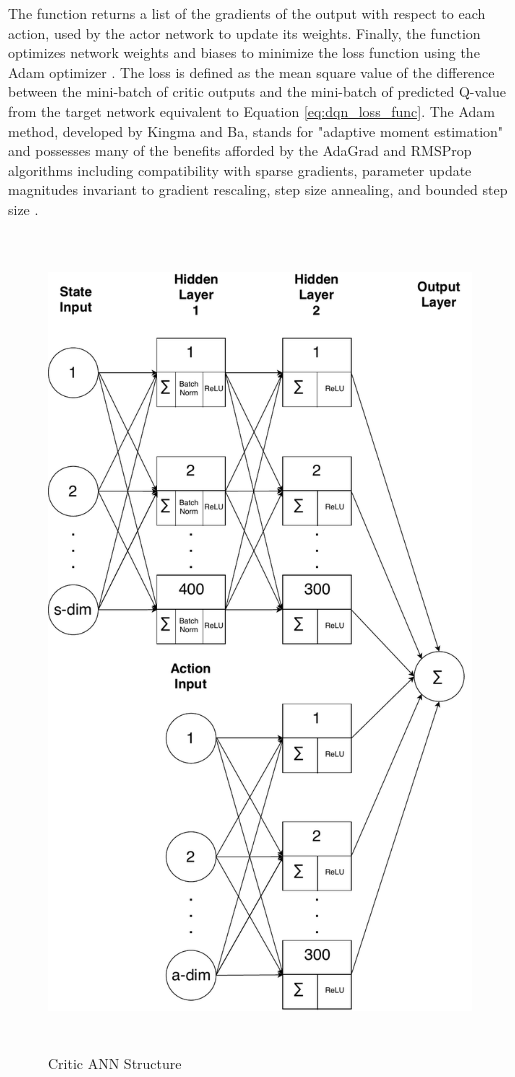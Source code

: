 The  function returns a list of the gradients of the output with respect to each action, used by the actor network to update its weights. Finally, the  function optimizes network weights and biases to minimize the loss function using the Adam optimizer \cite{adam_opt}. The loss is defined as the mean square value of the difference between the mini-batch of critic outputs and the mini-batch of predicted Q-value from the target network equivalent to Equation \ref{eq:dqn_loss_func}. The Adam method, developed by Kingma and Ba, stands for "adaptive moment estimation" and possesses many of the benefits afforded by the AdaGrad and RMSProp algorithms including compatibility with sparse gradients, parameter update magnitudes invariant to gradient rescaling, step size annealing, and bounded step size \cite{adam_opt}\cite{duchi_2011}\cite{tieleman_2012}.
\begin{figure}[H]   %
	\centering \includegraphics[width=6in, height=8.5in, keepaspectratio]{figures/critic_net.pdf}
	\caption{Critic ANN Structure}\label{fig:critic_net}
\end{figure}

